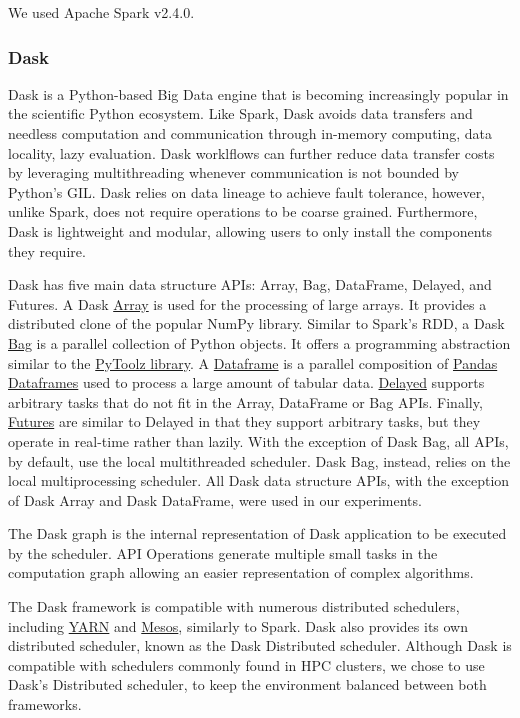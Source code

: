 \documentclass[conference]{IEEEtran}
\begin{document}
We used Apache Spark v2.4.0.

\subsubsection{Dask} Dask is a Python-based Big Data engine that is becoming
increasingly popular in the scientific Python ecosystem. Like Spark, Dask avoids data transfers and needless computation and communication through
in-memory computing, data locality, lazy evaluation. Dask worklflows can 
further reduce data transfer costs by leveraging multithreading whenever 
communication is not bounded by Python's GIL. Dask relies on data 
lineage to achieve fault tolerance, however, unlike Spark, does not require
operations to be coarse grained. Furthermore, Dask is lightweight and modular,
allowing users to only install the components they require.

Dask has five main data structure APIs:
Array, Bag, DataFrame, Delayed, and Futures. A Dask
\href{https://docs.dask.org/en/latest/array.html}{Array} is used for the
processing of large arrays. It provides a distributed clone of the popular NumPy
library. Similar to Spark's RDD, a Dask
\href{https://docs.dask.org/en/latest/bag.html}{Bag} is a parallel
collection of Python objects. It offers a programming abstraction similar to the
\href{https://toolz.readthedocs.io/en/latest/}{PyToolz library}. A
\href{https://docs.dask.org/en/latest/dataframe.html}{Dataframe} is a parallel
composition of
\href{http://pandas.pydata.org/pandas-docs/stable/reference/api/pandas.DataFrame.html}{Pandas Dataframes} used to process a large amount of tabular data.
\href{https://docs.dask.org/en/latest/delayed.html}{Delayed} supports
arbitrary tasks
that do not fit in the Array, DataFrame or Bag APIs. Finally,
\href{https://docs.dask.org/en/latest/futures.html}{Futures} are similar to
Delayed in that they support arbitrary tasks, but they operate in real-time
rather than lazily. With the exception of Dask Bag, all APIs, by default, use
the local multithreaded scheduler. Dask Bag, instead, relies on the local
multiprocessing scheduler.  All Dask data structure APIs, with the exception of
Dask Array and Dask DataFrame, were used in our experiments.


The Dask graph is the internal representation of Dask application to be
executed  by the scheduler. API Operations generate multiple small tasks in
the computation graph allowing an easier representation of complex
algorithms.

The Dask framework is compatible with numerous distributed schedulers, including 
\href{https://github.com/dask/dask-yarn}{YARN} and
\href{https://github.com/mrocklin/dask-mesos}{Mesos}, similarly to Spark. Dask 
also provides its own distributed scheduler, known as the Dask Distributed
scheduler. Although Dask is compatible with schedulers commonly found in HPC
clusters, we chose to use Dask's Distributed scheduler, to keep the environment
balanced between both frameworks.
\end{document}
